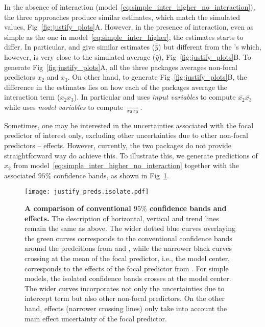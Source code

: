 In the absence of interaction (model~\ref{eq:simple_inter_higher_no_interaction}), the three approaches produce similar estimates, which match the simulated values, Fig~\ref{fig:justify_plots}A. However, in the presence of interaction, even as simple as the one in model~\ref{eq:simple_inter_higher}, the estimates starts to differ. In particular,  and  give similar estimates ($\bar{\hat{y}}$) but different from the 's which, however, is very close to the simulated average ($\bar{y}$), Fig~\ref{fig:justify_plots}B. To generate Fig~\ref{fig:justify_plots}A, all the three packages averages non-focal predictors $x_2$ and $x_3$. On other hand, to generate Fig~\ref{fig:justify_plots}B, the difference in the estimates lies on how each of the packages average the interaction term ($x_2x_3$). In particular  and  uses \emph{input variables} to compute $\bar{x_2}\bar{x_3}$ while  uses \emph{model variables} to compute $\over{x_2x_3}$.

Sometimes, one may be interested in the uncertainties associated with the focal predictor of interest only, excluding other uncertainties due to other non-focal predictors -- effects. However, currently, the two packages do not provide straightforward way do achieve this. To illustrate this, we generate predictions of $x_2$ from model~\ref{eq:simple_inter_higher_no_interaction} together with the associated $95\%$ confidence bands, as shown in Fig~\ref{fig:justify_ci_plots}. 

\begin{figure}[!h]
\begin{center}
\texttt{[image: justify\_preds.isolate.pdf]}
\end{center}
\caption{{\bf A comparison of conventional $95\%$ confidence bands and effects.} The description of horizontal, vertical and trend lines remain the same as above. The wider dotted blue curves overlaying the green curves corresponds to the conventional confidence bands around the predcitions from  and , while the narrower black curves crossing at the mean of the focal predictor, i.e., the model center, corresponds to the effects of the focal predictor from . For simple models, the isolated confidence bands crosses at the model center. The wider curves incorporates not only the uncertainties due to intercept term but also other non-focal predictors. On the other hand, effects (narrower crossing lines) only take into account the main effect uncertainty of the focal predictor.}
\label{fig:justify_ci_plots}
\end{figure}

